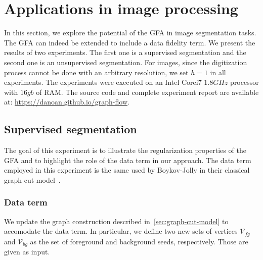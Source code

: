 \documentclass[review]{siamart220329}
\begin{document}
\section{Applications in image processing}

In this section, we explore the potential of the GFA in image segmentation
tasks. The GFA can indeed be extended to include a data fidelity term. We
present the results of two experiments. The first one is a supervised
segmentation and the second one is an unsupervised segmentation. For images,
since the digitization process cannot be done with an arbitrary resolution, we
set $h=1$ in all experiments. The experiments were executed on an Intel Corei7
$1.8GHz$ processor with $16gb$ of RAM. The source code and complete experiment
report are available at: \url{https://danoan.github.io/graph-flow}.


\subsection{Supervised segmentation}

The goal of this experiment is to illustrate the regularization properties of
the GFA and to highlight the role of the data term in our approach. The data
term employed in this experiment is the same used by Boykov-Jolly in their
classical graph cut model~\cite{boykov01graphcut}. 

\subsubsection{Data term}
We update the graph construction described in~\cref{sec:graph-cut-model} to
accomodate the data term. In particular, we define two new sets of vertices
$\mathcal{V}_{fg}$ and $\mathcal{V}_{bg}$ as the set of foreground and
background seeds, respectively. Those are given as input.
\end{document}
